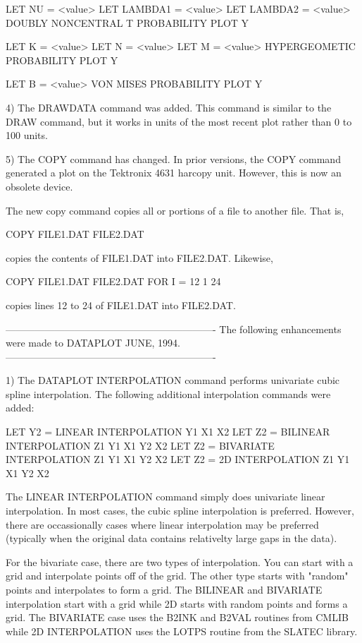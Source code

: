 {       LET NU = <value>
       LET LAMBDA1 = <value>
       LET LAMBDA2 = <value>
       DOUBLY NONCENTRAL T PROBABILITY PLOT Y

       LET K = <value>
       LET N = <value>
       LET M = <value>
       HYPERGEOMETIC PROBABILITY PLOT Y

       LET B = <value>
       VON MISES PROBABILITY PLOT Y

 4) The DRAWDATA command was added.  This command is similar to
    the DRAW command, but it works in units of the most recent plot
    rather than 0 to 100 units.

 5) The COPY command has changed.  In prior versions, the COPY command
    generated a plot on the Tektronix 4631 harcopy unit.  However, this
    is now an obsolete device.

    The new copy command copies all or portions of a file to another
    file.  That is,

      COPY FILE1.DAT FILE2.DAT

    copies the contents of FILE1.DAT into FILE2.DAT.  Likewise,

      COPY FILE1.DAT FILE2.DAT FOR I = 12 1 24

    copies lines 12 to 24 of FILE1.DAT into FILE2.DAT.

----------------------------------------------------------------
The following enhancements were made to DATAPLOT JUNE, 1994.
----------------------------------------------------------------

 1) The DATAPLOT INTERPOLATION command performs univariate cubic
    spline interpolation.  The following additional interpolation
    commands were added:

      LET Y2 = LINEAR INTERPOLATION Y1 X1 X2
      LET Z2 = BILINEAR INTERPOLATION Z1 Y1 X1 Y2 X2
      LET Z2 = BIVARIATE INTERPOLATION Z1 Y1 X1 Y2 X2
      LET Z2 = 2D INTERPOLATION Z1 Y1 X1 Y2 X2
      
    The LINEAR INTERPOLATION command simply does univariate linear
    interpolation.  In most cases, the cubic spline interpolation is
    preferred.  However, there are occassionally cases where linear
    interpolation may be preferred (typically when the original data
    contains relativelty large gaps in the data).

    For the bivariate case, there are two types of interpolation.  You
    can start with a grid and interpolate points off of the grid.  The
    other type starts with "random" points and interpolates to form a
    grid.  The BILINEAR and BIVARIATE interpolation start with a grid
    while 2D starts with random points and forms a grid.  The BIVARIATE
    case uses the B2INK and B2VAL routines from CMLIB while 2D 
    INTERPOLATION uses the LOTPS routine from the SLATEC library.

}
